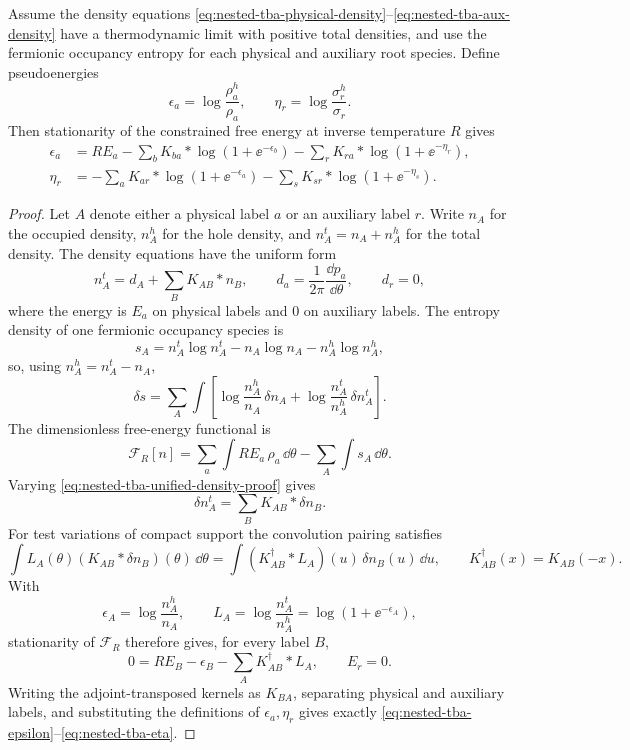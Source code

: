 \begin{proposition}
\label{prop:nested-tba-variational}
Assume the density equations
\eqref{eq:nested-tba-physical-density}--\eqref{eq:nested-tba-aux-density}
have a thermodynamic limit with positive total densities, and use the
fermionic occupancy entropy for each physical and auxiliary root species.
Define pseudoenergies
\[
  \epsilon_a=\log\frac{\rho_a^h}{\rho_a},
  \qquad
  \eta_r=\log\frac{\sigma_r^h}{\sigma_r}.
\]
Then stationarity of the constrained free energy at inverse temperature \(R\)
gives
\begin{align}
  \epsilon_a
  &=
  R E_a
  -\sum_b K_{ba}*\log(1+\ee^{-\epsilon_b})
  -\sum_r K_{r a}*\log(1+\ee^{-\eta_r}),
  \label{eq:nested-tba-epsilon}\\
  \eta_r
  &=
  -\sum_a K_{a r}*\log(1+\ee^{-\epsilon_a})
  -\sum_s K_{s r}*\log(1+\ee^{-\eta_s}).
  \label{eq:nested-tba-eta}
\end{align}
\end{proposition}

\begin{proof}
Let \(A\) denote either a physical label \(a\) or an auxiliary label \(r\).
Write \(n_A\) for the occupied density, \(n_A^h\) for the hole density, and
\(n_A^t=n_A+n_A^h\) for the total density.  The density equations have the
uniform form
\begin{equation}
  n_A^t=d_A+\sum_B K_{AB}*n_B,
  \qquad
  d_a=\frac1{2\pi}\frac{\dd p_a}{\dd\theta},
  \qquad
  d_r=0 ,
  \label{eq:nested-tba-unified-density-proof}
\end{equation}
where the energy is \(E_a\) on physical labels and \(0\) on auxiliary labels.
The entropy density of one fermionic occupancy species is
\[
  s_A=n_A^t\log n_A^t-n_A\log n_A-n_A^h\log n_A^h,
\]
so, using \(n_A^h=n_A^t-n_A\),
\[
  \delta s
  =
  \sum_A\int \left[
    \log\frac{n_A^h}{n_A}\,\delta n_A
    +
    \log\frac{n_A^t}{n_A^h}\,\delta n_A^t
  \right].
\]
The dimensionless free-energy functional is
\[
  \mathcal F_R[n]
  =
  \sum_a\int R E_a\,\rho_a\,\dd\theta-\sum_A\int s_A\,\dd\theta .
\]
Varying \eqref{eq:nested-tba-unified-density-proof} gives
\[
  \delta n_A^t=\sum_BK_{AB}*\delta n_B .
\]
For test variations of compact support the convolution pairing satisfies
\[
  \int L_A(\theta)(K_{AB}*\delta n_B)(\theta)\,\dd\theta
  =
  \int (K_{AB}^{\dagger}*L_A)(u)\,\delta n_B(u)\,\dd u,
  \qquad
  K_{AB}^{\dagger}(x)=K_{AB}(-x).
\]
With
\[
  \epsilon_A=\log\frac{n_A^h}{n_A},
  \qquad
  L_A=\log\frac{n_A^t}{n_A^h}=\log(1+\ee^{-\epsilon_A}),
\]
stationarity of \(\mathcal F_R\) therefore gives, for every label \(B\),
\begin{equation}
  0=
  R E_B-\epsilon_B-\sum_A K_{AB}^{\dagger}*L_A ,
  \qquad E_r=0 .
  \label{eq:nested-tba-euler-lagrange-proof}
\end{equation}
Writing the adjoint-transposed kernels as \(K_{BA}\), separating physical and
auxiliary labels, and substituting the definitions of
\(\epsilon_a,\eta_r\) gives exactly
\eqref{eq:nested-tba-epsilon}--\eqref{eq:nested-tba-eta}.
\end{proof}

